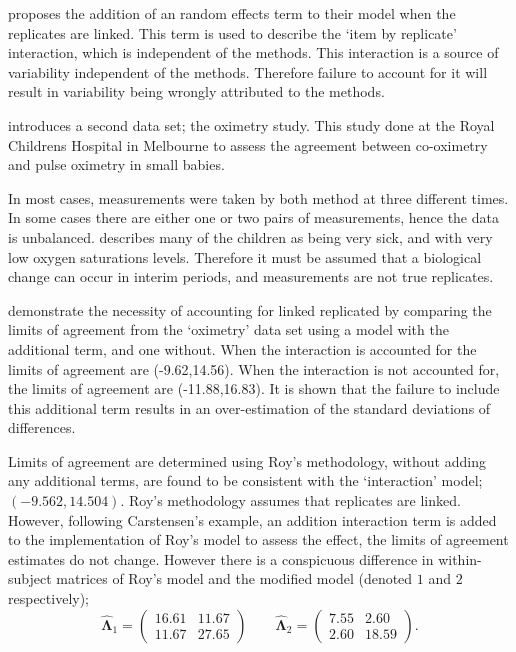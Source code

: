 \documentclass[12pt, a4paper]{report}
\theoremstyle{plain}
\theoremstyle{definition}
\theoremstyle{remark}
\begin{document}
\citet{BXC2008} proposes the addition of an random effects term to their model when the replicates are linked. This term is used to describe the `item by replicate' interaction, which is independent of the methods. This interaction is a source of variability independent of the methods. Therefore failure to account for it will result in variability being wrongly attributed to the methods.

\citet{BXC2008} introduces a second data set; the oximetry study. This study done at the Royal Childrens Hospital in
Melbourne to assess the agreement between co-oximetry and pulse oximetry in small babies.

In most cases, measurements were taken by both method at three different times. In some cases there are either one or two pairs of measurements, hence the data is unbalanced. \citet{BXC2008} describes many of the children as being very sick, and with very low oxygen saturations levels. Therefore it must be assumed that a biological change can occur in interim periods, and measurements are not true replicates.

\citet{BXC2008} demonstrate the necessity of accounting for linked replicated by comparing the limits of agreement from the `oximetry' data set using a model with the additional term, and one without. When the interaction is accounted for the limits of agreement are (-9.62,14.56). When the interaction is not accounted for, the limits of agreement are (-11.88,16.83). It is shown that the failure to include this additional term results in an over-estimation of the standard deviations of differences.

Limits of agreement are determined using Roy's methodology, without adding any additional terms, are found to be consistent with the `interaction' model; $(-9.562, 14.504 )$. Roy's methodology assumes that replicates are linked. However, following Carstensen's example, an addition interaction term is added to the implementation of Roy's model to assess the effect, the limits of agreement estimates do not change. However there is a conspicuous difference in within-subject matrices of Roy's model and the modified model (denoted $1$ and $2$ respectively);
\begin{equation}
\hat{\boldsymbol{\Lambda}}_{1}= \begin{pmatrix}
	16.61 &	11.67\\
	11.67 & 27.65 
	\end{pmatrix}\qquad
\boldsymbol{\hat{\Lambda}}_{2}= \begin{pmatrix}
	7.55 & 2.60 \\
	2.60 & 18.59
		\end{pmatrix}.
\end{equation}
\end{document}
